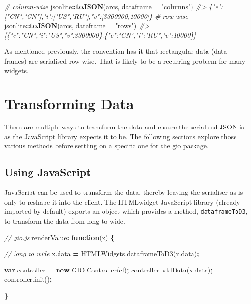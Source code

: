 \documentclass[
]{krantz}
\makeatletter
\newenvironment{Shaded}{\begin{snugshade}}{\end{snugshade}}
\newcommand{\AttributeTok}[1]{\textcolor[rgb]{0.61,0.61,0.61}{#1}}
\newcommand{\CommentTok}[1]{\textcolor[rgb]{0.37,0.37,0.37}{\textit{#1}}}
\newcommand{\DataTypeTok}[1]{\textcolor[rgb]{0.27,0.27,0.27}{#1}}
\newcommand{\KeywordTok}[1]{\textcolor[rgb]{0.27,0.27,0.27}{\textbf{#1}}}
\newcommand{\NormalTok}[1]{#1}
\newcommand{\OperatorTok}[1]{\textcolor[rgb]{0.43,0.43,0.43}{\textbf{#1}}}
\newcommand{\StringTok}[1]{\textcolor[rgb]{0.5,0.5,0.5}{#1}}
\newcommand{\VariableTok}[1]{\textcolor[rgb]{0,0,0}{#1}}
\newenvironment{kframe}{%
\medskip{}
\setlength{\fboxsep}{.8em}
 \def\at@end@of@kframe{}%
 \ifinner\ifhmode%
  \def\at@end@of@kframe{\end{minipage}}%
  \begin{minipage}{\columnwidth}%
 \fi\fi%
 \def\FrameCommand##1{\hskip\@totalleftmargin \hskip-\fboxsep
 \colorbox{shadecolor}{##1}\hskip-\fboxsep
     \hskip-\linewidth \hskip-\@totalleftmargin \hskip\columnwidth}%
 \MakeFramed {\advance\hsize-\width
   \@totalleftmargin\z@ \linewidth\hsize
   \@setminipage}}%
 {\par\unskip\endMakeFramed%
 \at@end@of@kframe}
\renewenvironment{Shaded}{\begin{kframe}}{\end{kframe}}
\makeatother
\begin{document}
\begin{Shaded}
\begin{Highlighting}[]
\CommentTok{\# column{-}wise}
\NormalTok{jsonlite}\OperatorTok{::}\KeywordTok{toJSON}\NormalTok{(arcs, }\DataTypeTok{dataframe =} \StringTok{"columns"}\NormalTok{)}
\CommentTok{\#> \{"e":["CN","CN"],"i":["US","RU"],"v":[3300000,10000]\}}
\CommentTok{\# row{-}wise}
\NormalTok{jsonlite}\OperatorTok{::}\KeywordTok{toJSON}\NormalTok{(arcs, }\DataTypeTok{dataframe =} \StringTok{"rows"}\NormalTok{)}
\CommentTok{\#> [\{"e":"CN","i":"US","v":3300000\},\{"e":"CN","i":"RU","v":10000\}]}
\end{Highlighting}
\end{Shaded}

As mentioned previously, the convention has it that rectangular data (data frames) are serialised row-wise. That is likely to be a recurring problem for many widgets.

\hypertarget{widgets-full-transform-data}{%
\section{Transforming Data}\label{widgets-full-transform-data}}

There are multiple ways to transform the data and ensure the serialised JSON is as the JavaScript library expects it to be. The following sections explore those various methods before settling on a specific one for the gio package.

\hypertarget{widgets-full-transform-data-js}{%
\subsection{Using JavaScript}\label{widgets-full-transform-data-js}}

JavaScript can be used to transform the data, thereby leaving the serialiser as-is only to reshape it into the client. The HTMLwidget JavaScript library (already imported by default) exports an object which provides a method, \texttt{dataframeToD3}, to transform the data from long to wide.

\begin{Shaded}
\begin{Highlighting}[]
\CommentTok{// gio.js}
\NormalTok{renderValue}\OperatorTok{:} \KeywordTok{function}\NormalTok{(x) }\OperatorTok{\{}

  \CommentTok{// long to wide}
  \VariableTok{x}\NormalTok{.}\AttributeTok{data} \OperatorTok{=} \VariableTok{HTMLWidgets}\NormalTok{.}\AttributeTok{dataframeToD3}\NormalTok{(}\VariableTok{x}\NormalTok{.}\AttributeTok{data}\NormalTok{)}\OperatorTok{;}

  \KeywordTok{var}\NormalTok{ controller }\OperatorTok{=} \KeywordTok{new} \VariableTok{GIO}\NormalTok{.}\AttributeTok{Controller}\NormalTok{(el)}\OperatorTok{;}
  \VariableTok{controller}\NormalTok{.}\AttributeTok{addData}\NormalTok{(}\VariableTok{x}\NormalTok{.}\AttributeTok{data}\NormalTok{)}\OperatorTok{;} 
  \VariableTok{controller}\NormalTok{.}\AttributeTok{init}\NormalTok{()}\OperatorTok{;}

\OperatorTok{\}}
\end{Highlighting}
\end{Shaded}
\end{document}
